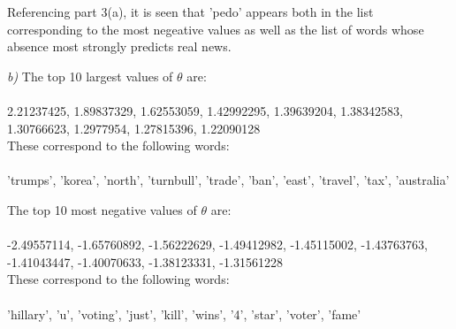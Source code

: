 \documentclass{article}
\begin{document}
Referencing part 3(a), it is seen that 'pedo' appears both in the list corresponding to the most negeative values as well as the list of words whose absence most strongly predicts real news.

\textit{b)}
The top 10 largest values of $\theta$ are:\\\\
2.21237425, 1.89837329, 1.62553059, 1.42992295, 1.39639204, 1.38342583, 1.30766623, 1.2977954,  1.27815396, 1.22090128\\
 
 These correspond to the following words:\\\\
 'trumps', 'korea', 'north', 'turnbull', 'trade', 'ban', 'east', 'travel', 'tax', 'australia'
 
 The top 10 most negative values of $\theta$ are:\\\\
 -2.49557114, -1.65760892, -1.56222629, -1.49412982, -1.45115002, -1.43763763, -1.41043447, -1.40070633, -1.38123331, -1.31561228\\
 
 These correspond to the following words:\\\\
 'hillary', 'u', 'voting', 'just', 'kill', 'wins', '4', 'star', 'voter', 'fame'
\end{document}
